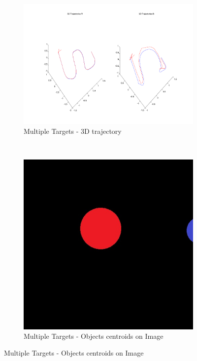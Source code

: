 \begin{figure}[ht]
	\centering
	\begin{subfigure}[ht]{0.6\linewidth}
		\centering
		\includegraphics[width=\linewidth]{../Images/c3/sim4_3dtraj}
		\caption{Multiple Targets - 3D trajectory}
		\label{fig:sim4_3dtraj}
	\end{subfigure}
	~
	\begin{subfigure}[ht]{0.2\linewidth}
		\centering
		\includegraphics[width=\linewidth]{../Images/c3/sims_two_object_centroid_out}
		\caption{Multiple Targets - Objects centroids on Image}
		\label{fig:sim4_centroid_objs}
	\end{subfigure}
\end{figure}